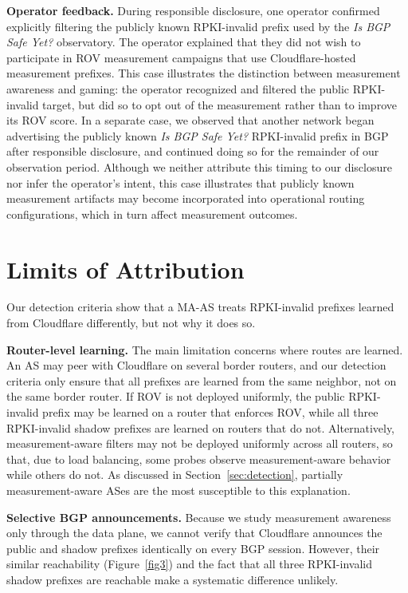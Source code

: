 \documentclass[sigconf, 10pt]{acmart}
\begin{document}
\noindent\textbf{Operator feedback.} During responsible disclosure, one operator confirmed explicitly filtering the publicly known RPKI-invalid prefix used by the \textit{Is BGP Safe Yet?} observatory. The operator explained that they did not wish to participate in ROV measurement campaigns that use Cloudflare-hosted measurement prefixes. This case illustrates the distinction between measurement awareness and gaming: the operator recognized and filtered the public RPKI-invalid target, but did so to opt out of the measurement rather than to improve its ROV score. In a separate case, we observed that another network began advertising the publicly known \textit{Is BGP Safe Yet?} RPKI-invalid prefix in BGP after responsible disclosure, and continued doing so for the remainder of our observation period. Although we neither attribute this timing to our disclosure nor infer the operator's intent, this case illustrates that publicly known measurement artifacts may become incorporated into operational routing configurations, which in turn affect measurement outcomes.

\section{Limits of Attribution}

Our detection criteria show that a MA-AS treats RPKI-invalid prefixes learned from Cloudflare differently, but not why it does so.

\noindent\textbf{Router-level learning.} The main limitation concerns where routes are learned. An AS may peer with Cloudflare on several border routers, and our detection criteria only ensure that all prefixes are learned from the same neighbor, not on the same border router. If ROV is not deployed uniformly, the public RPKI-invalid prefix may be learned on a router that enforces ROV, while all three RPKI-invalid shadow prefixes are learned on routers that do not. Alternatively, measurement-aware filters may not be deployed uniformly across all routers, so that, due to load balancing, some probes observe measurement-aware behavior while others do not. As discussed in Section~\ref{sec:detection}, partially measurement-aware ASes are the most susceptible to this explanation.

\noindent\textbf{Selective BGP announcements.} Because we study measurement awareness only through the data plane, we cannot verify that Cloudflare announces the public and shadow prefixes identically on every BGP session. However, their similar reachability (Figure~\ref{fig3}) and the fact that all three RPKI-invalid shadow prefixes are reachable make a systematic difference unlikely.
\end{document}
